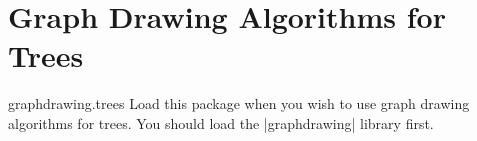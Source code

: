 %
%
%

\section{Graph Drawing Algorithms for Trees}


\begin{tikzlibrary}{graphdrawing.trees}
  Load this package when you wish to use graph drawing algorithms for
  trees. You should load the |graphdrawing| library first.
\end{tikzlibrary}

\ifluatex\relax{}\expandafter\endinput\fi


\begin{key}{/graph drawing/tree=\meta{options}}
  \keyalias{tikz}\keyalias{tikz/graphs}
  Similar to the |>| option, this ``generic'' name for a tree drawing
  algorithm is not hardwired to any specific algorithm. Rather, users
  can select an algorithm somewhere at the beginning of their program
  and then just write |\graph[tree]| to draw a tree.

  The \meta{options} will be forwarded to the currently selected
  algorithm.
\begin{codeexample}[]
\tikz \graph [tree] { a -> {b,c} };    
\end{codeexample}
  
  To change the algorithm, change the following key:
  \begin{key}{/graph drawing/tree/default algorithm=\meta{algorithm}}
    Set this key to the tree drawing algorithm of your choice. The
    default is |AhrensFKSS2011 tree|, but this will change.
  \end{key}
\end{key}


